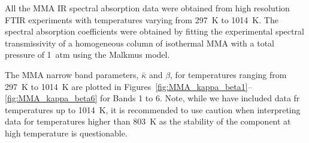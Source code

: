 All the MMA IR spectral absorption data were obtained from high resolution FTIR experiments with temperatures varying from 297~K to 1014~K. The spectral absorption coefficients were obtained by fitting the experimental spectral transmissivity of a homogeneous column of isothermal MMA with a total pressure of 1~atm using the Malkmus model.

The MMA narrow band parameters, $\bar{\kappa}$ and $\beta$, for temperatures ranging from 297~K to 1014~K are plotted in Figures~\ref{fig:MMA_kappa_beta1}--\ref{fig:MMA_kappa_beta6} for Bands 1 to 6. Note, while we have included data fr temperatures up to 1014~K, it is recommended to use caution when interpreting data for temperatures higher than 803~K as the stability of the component at high temperature is questionable.

\newpage

